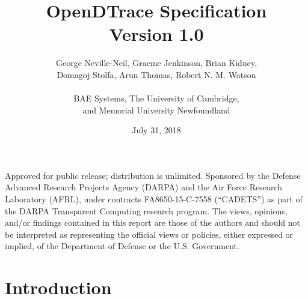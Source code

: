 


\title{OpenDTrace Specification\\
  {\large Version 1.0}
}

\date{July 31, 2018}

\author{
  George Neville-Neil, Graeme Jenkinson, Brian Kidney, \\
  Domagoj Stolfa,  Arun Thomas, Robert N. M. Watson \\
  \\
  BAE Systems, The University of Cambridge, \\
  and Memorial University Newfoundland }

\begin{minipage}[h]{\textwidth}
  \maketitle

  \vspace{2in}
  {\small
  Approved for public release; distribution is unlimited.
  Sponsored by the Defense Advanced Research Projects Agency (DARPA) and the
  Air Force Research Laboratory (AFRL), under contracts FA8650-15-C-7558
  (``CADETS'') as part of the DARPA Transparent Computing research program.
  The views, opinions, and/or findings contained in this report are those of the
  authors and should not be interpreted as representing the official views or
  policies, either expressed or implied, of the Department of Defense
  or the U.S. Government.}
\end{minipage}

\normalsize



\clearpage



\clearpage



\clearpage

\tableofcontents

\clearpage

\chapter{Introduction}
\label{chap:introduction}


